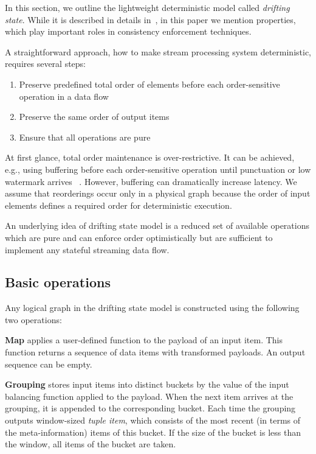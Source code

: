 
\label {fs-model-section}

In this section, we outline the lightweight deterministic model called {\em drifting state}. While it is described in details in~\cite{we2018adbis}, in this paper we mention properties, which play important roles in consistency enforcement techniques.

A straightforward approach, how to make stream processing system deterministic, requires several steps:
\begin{enumerate}
    \item Preserve predefined total order of elements before each order-sensitive operation in a data flow
    \item Preserve the same order of output items
    \item Ensure that all operations are pure
\end{enumerate}

At first glance, total order maintenance is over-restrictive. It can be achieved, e.g., using buffering before each order-sensitive operation until punctuation or low watermark arrives ~\cite{Li:2008:OPN:1453856.1453890}. However, buffering can dramatically increase latency. We assume that reorderings occur only in a physical graph because the order of input elements defines a required order for deterministic execution.

An underlying idea of drifting state model is a reduced set of available operations which are pure and can enforce order optimistically but are sufficient to implement any stateful streaming data flow. 

\subsection{Basic operations}

Any logical graph in the drifting state model is constructed using the following two operations:

{\bf Map} applies a user-defined function to the payload of an input item. This function returns a sequence of data items with transformed payloads. An output sequence can be empty.

{\bf Grouping} stores input items into distinct buckets by the value of the input balancing function applied to the payload. When the next item arrives at the grouping, it is appended to the corresponding bucket. Each time the grouping outputs window-sized {\it tuple item}, which consists of the most recent (in terms of the meta-information) items of this bucket. If the size of the bucket is less than the window, all items of the bucket are taken.

